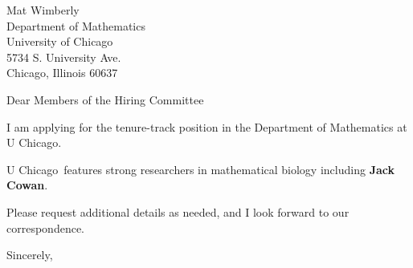 




	
	
	\def\School{U Chicago}
	
	\begin{letter}
		{Mat Wimberly\\
		Department of Mathematics\\
		University of Chicago\\
		5734 S. University Ave.\\
		Chicago, Illinois 60637
		}
		
		\opening{Dear Members of the Hiring Committee}
		
		
		I am applying for the tenure-track position in the Department of Mathematics at \School. 
		
		\School~features strong researchers in mathematical biology including \textbf{Jack Cowan}. 
		
		
		
		
		
		Please request additional details as needed, and I look forward to our correspondence.
		
		\closing{Sincerely,}
	\end{letter}
